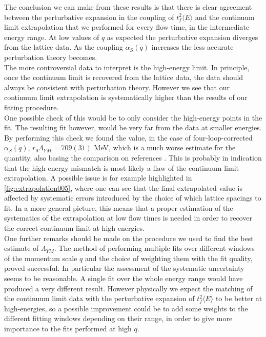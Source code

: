 The conclusion we can make from these results is that there is clear agreement between the perturbative expansion in the coupling of $t_f^2\langle E\rangle$ and the continuum limit extrapolation that we performed for every flow time, in the intermediate energy range. At low values of $q$ as expected  the perturbative expansion diverges from the lattice data. As the coupling $\alpha_S(q)$ increases the less accurate perturbation theory becomes.\\
The more controversial data to interpret is the high-energy limit. In principle, once the continuum limit is recovered from the lattice data, the data should always be consistent with perturbation theory. However we see that our continuum limit extrapolation is systematically higher than the results of our fitting procedure.  \\
One possible check of this would be to only consider the high-energy points in the fit. The resulting fit however, would be very far from the data at smaller energies. By performing this check we found the value, in the case of four-loop-corrected $\alpha_S(q)$, $r_0\Lambda_{YM} = 709(31)$ MeV, which is a much worse estimate for the quantity, also basing the comparison on references \cite{capitani_non-perturbative_1999}. This is probably in indication that the high energy mismatch is most likely a flaw of the continuum limit extrapolation. A possible issue is for example highlighted in \cref{fig:extrapolation005}, where one can see that the final extrapolated value is affected by systematic errors introduced by the choice of which lattice spacings to fit. In a more general picture, this means that a proper estimation of the systematics of the extrapolation at low flow times is needed in order to recover the correct continuum limit at high energies.\\
One further remarks should be made on the procedure we used to find the best estimate of $\Lambda_{YM}$. The method of performing multiple fits over different windows of the momentum scale $q$ and the choice of weighting them with the fit quality, proved successful. In particular the assessment of the systematic uncertainty seems to be reasonable. A single fit over the whole energy range would have produced a very different result. However physically we expect the matching of the continuum limit data with the perturbative expansion of  $t_f^2\langle E\rangle$  to be better at high-energies, so a possible improvement could be to add some weights to the different fitting windows depending on their range, in order to give more importance to the fits performed at high $q$. 